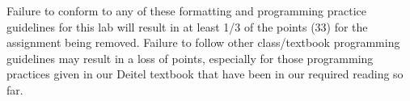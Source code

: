 \documentclass[11pt]{article}
\begin{document}
Failure to conform to any of these formatting and programming practice
guidelines for this lab will result in at least 1/3 of the points (33)
for the assignment being removed.  Failure to follow other
class/textbook programming guidelines may result in a loss of points,
especially for those programming practices given in our Deitel
textbook that have been in our required reading so far.
\end{document}
